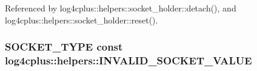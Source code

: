 Referenced by log4cplus\-::helpers\-::socket\-\_\-holder\-::detach(), and log4cplus\-::helpers\-::socket\-\_\-holder\-::reset().

\hypertarget{namespacelog4cplus_1_1helpers_a03901d2bf5f2a4ed622f4b1cdcb5e8a8}{
\subsubsection[{I\-N\-V\-A\-L\-I\-D\-\_\-\-S\-O\-C\-K\-E\-T\-\_\-\-V\-A\-L\-U\-E}]{ {\bf S\-O\-C\-K\-E\-T\-\_\-\-T\-Y\-P\-E} const log4cplus\-::helpers\-::\-I\-N\-V\-A\-L\-I\-D\-\_\-\-S\-O\-C\-K\-E\-T\-\_\-\-V\-A\-L\-U\-E}}\label{namespacelog4cplus_1_1helpers_a03901d2bf5f2a4ed622f4b1cdcb5e8a8}
